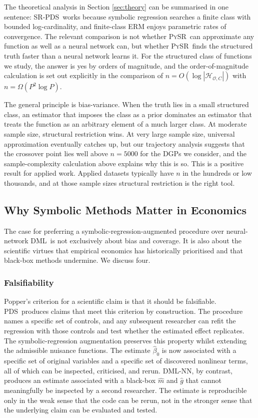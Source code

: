 \documentclass[11pt, a4paper]{article}
\theoremstyle{plain}
\theoremstyle{definition}
\theoremstyle{remark}
\newcommand{\pds}{\textsc{PDS}}
\newcommand{\dml}{\textsc{DML}}
\newcommand{\pysr}{\textsc{PySR}}
\newcommand{\epds}{\textsc{SR-PDS}}
\newcommand{\betahat}{\hat{\beta}_0}
\newcommand{\Hcal}{\mathcal{H}_{\mathcal{O}, C}}
\begin{document}
The theoretical analysis in Section \ref{sec:theory} can be
summarised in one sentence: \epds\ works because symbolic
regression searches a finite class with bounded log-cardinality,
and finite-class ERM enjoys parametric rates of convergence. The
relevant comparison is not whether \pysr\ can approximate any
function as well as a neural network can, but whether \pysr\
finds the structured truth faster than a neural network learns
it. For the structured class of functions we study, the answer
is yes by orders of magnitude, and the order-of-magnitude
calculation is set out explicitly in the comparison of $n =
O(\log |\Hcal|)$ with $n = \Omega(P^2 \log P)$.

The general principle is bias-variance. When the truth lies in
a small structured class, an estimator that imposes the class
as a prior dominates an estimator that treats the function as
an arbitrary element of a much larger class. At moderate sample
size, structural restriction wins. At very large sample size,
universal approximation eventually catches up, but our trajectory
analysis suggests that the crossover point lies well above
$n=5000$ for the DGPs we consider, and the sample-complexity
calculation above explains why this is so. This is a positive
result for applied work. Applied datasets typically have $n$ in
the hundreds or low thousands, and at those sample sizes
structural restriction is the right tool.

\subsection{Why Symbolic Methods Matter in Economics}

The case for preferring a symbolic-regression-augmented
procedure over neural-network \dml\ is not exclusively about
bias and coverage. It is also about the scientific virtues that
empirical economics has historically prioritised and that
black-box methods undermine. We discuss four.

\subsubsection{Falsifiability}

Popper's criterion for a scientific
claim is that it should be falsifiable. \pds\ produces claims
that meet this criterion by construction. The procedure names a
specific set of controls, and any subsequent researcher can
refit the regression with those controls and test whether the
estimated effect replicates. The symbolic-regression augmentation
preserves this property whilst extending the admissible nuisance
functions. The estimate $\betahat$ is now associated with a
specific set of original variables and a specific set of
discovered nonlinear terms, all of which can be inspected,
criticised, and rerun. \dml-NN, by contrast, produces an
estimate associated with a black-box $\hat{m}$ and $\hat{g}$
that cannot meaningfully be inspected by a second researcher.
The estimate is reproducible only in the weak sense that the
code can be rerun, not in the stronger sense that the underlying
claim can be evaluated and tested.
\end{document}
